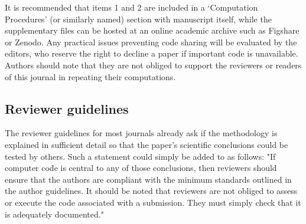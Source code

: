 It is recommended that items 1 and 2 are included in a `Computation Procedures' (or similarly named) section with manuscript itself, while the supplementary files can be hosted at an online academic archive such as Figshare or Zenodo. Any practical issues preventing code sharing will be evaluated by the editors, who reserve the right to decline a paper if important code is unavailable. Authors should note that they are not obliged to support the reviewers or readers of this journal in repeating their computations.

\subsection{Reviewer guidelines}

The reviewer guidelines for most journals already ask if the methodology is explained in sufficient detail so that the paper's scientific conclusions could be tested by others. Such a statement could simply be added to as follows: "If computer code is central to any of those conclusions, then reviewers should ensure that the authors are compliant with the minimum standards outlined in the author guidelines. It should be noted that reviewers are not obliged to assess or execute the code associated with a submission. They must simply check that it is adequately documented."   
  
  
  
  
